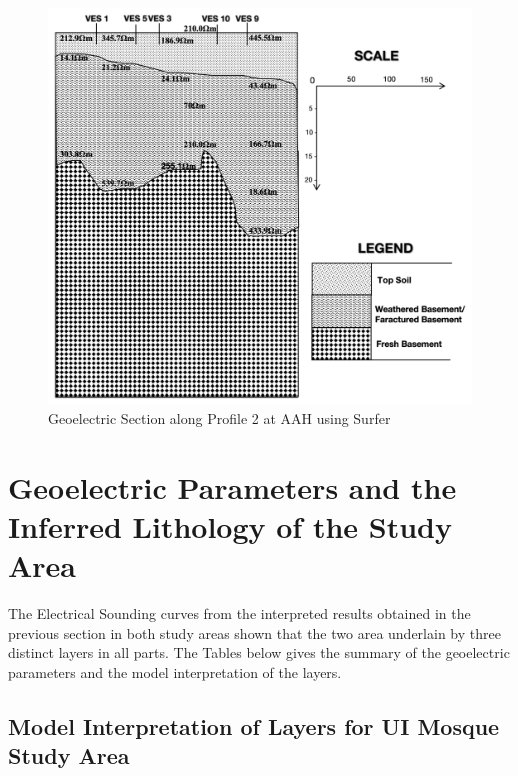 \documentclass[12pt,a4paper]{report}
\begin{document}
\begin{figure}[H]
    \centering
    \includegraphics[width=1.0\textwidth]{AAH_PROFILE_2.png}
    \caption{Geoelectric Section along Profile 2 at AAH using Surfer}
    \label{fig:AAH_Surfer_Profile_2}
\end{figure}

\section{Geoelectric Parameters and the Inferred Lithology of the Study Area}
The Electrical Sounding curves from the interpreted results obtained in the previous section in both study areas shown that the two area underlain by three distinct layers in all parts. The Tables below gives the summary of the geoelectric parameters and the model interpretation of the layers. 

\subsection{Model Interpretation of Layers for UI Mosque Study Area}
\end{document}
